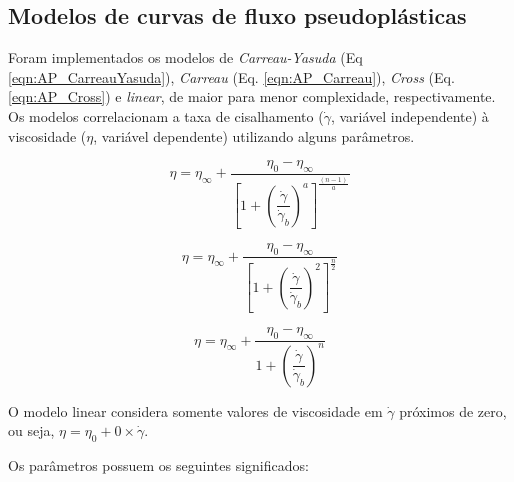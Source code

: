 			\subsection{Modelos de curvas de fluxo pseudoplásticas}
		\label{sec:modelagem_curva_fluxo}
		Foram implementados os modelos de \emph{Carreau-Yasuda} (Eq \ref{eqn:AP_CarreauYasuda}), \emph{Carreau} (Eq. \ref{eqn:AP_Carreau}), \emph{Cross} (Eq. \ref{eqn:AP_Cross}) e \emph{linear}, de maior para menor complexidade, respectivamente. Os modelos correlacionam a taxa de cisalhamento (\(\dot{\gamma}\), variável independente) à viscosidade (\(\eta\), variável dependente) utilizando alguns parâmetros.
		
		\begin{equation}
		\eta = \eta_{\infty} + \frac{\eta_0 - \eta_{\infty}}{\left[  1 + \left(  \dfrac{\dot{\gamma}}{\dot{\gamma}_b}  \right)^{a}  \right]^{\frac{ \left(  n - 1  \right) }{a}}}
		\label{eqn:AP_CarreauYasuda}
		\end{equation}
		
		\begin{equation}
		\eta = \eta_{\infty} + \frac{\eta_0 - \eta_{\infty}}{\left[  1 + \left(  \dfrac{\dot{\gamma}}{\dot{\gamma}_b}  \right)^{2}  \right]^{\frac{n}{2}}}
		\label{eqn:AP_Carreau}
		\end{equation}
		
		\begin{equation}
		\eta = \eta_{\infty} + \frac{\eta_0 - \eta_{\infty}}{1 + \left(  \dfrac{\dot{\gamma}}{\dot{\gamma}_b}  \right)^{n}}
		\label{eqn:AP_Cross}
		\end{equation}
		
		O modelo linear considera somente valores de viscosidade em \(\dot{\gamma}\) próximos de zero, ou seja, \(\eta = \eta_0 + 0 \times \dot{\gamma}\).
		
		Os parâmetros possuem os seguintes significados:
		
